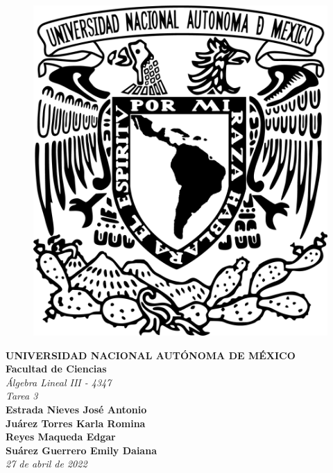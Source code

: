 \begin{center}
    \begin{figure}
        \raggedright
        \includegraphics[scale=0.2]{UNAM.png}
        \label{fig:my_label}
    \end{figure}
    
    \textbf{\Large{UNIVERSIDAD NACIONAL AUTÓNOMA DE MÉXICO}}\\
    \vspace{1cm}
    \textbf{\Large{Facultad de Ciencias}}\\
    \vspace{1cm}
    \textit{\Large{\'Algebra Lineal III - 4347}}\\
    \vspace{1cm}
    \textit{\large{Tarea 3}}\\
    \vspace{1cm}
    \textbf{\large{Estrada Nieves Jos\'e Antonio}}\\
    \vspace{1cm}
    \textbf{\large{Ju\'arez Torres Karla Romina}}\\
    \vspace{1cm}
    \textbf{\large{Reyes Maqueda Edgar}}\\
    \vspace{1cm}
    \textbf{\large{Su\'arez Guerrero Emily Daiana}}\\
    \vspace{1cm}
    \textit{\large{27 de abril de 2022}}
    

\end{center}
